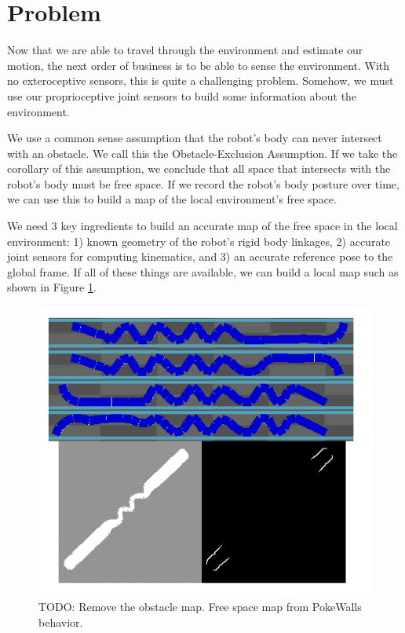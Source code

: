 
\label{chap:sensing}

\section{Problem}

Now that we are able to travel through the environment and estimate our motion, the next order of business is to be able to sense the environment.  With no exteroceptive sensors, this is quite a challenging problem.  Somehow, we must use our proprioceptive joint sensors to build some information about the environment.

We use a common sense assumption that the robot's body can never intersect with an obstacle.  We call this the Obstacle-Exclusion Assumption.  If we take the corollary of this assumption, we conclude that all space that intersects with the robot's body must be free space.  If we record the robot's body posture over time, we can use this to build a map of the local environment's free space.

We need 3 key ingredients to build an accurate map of the free space in the local environment:  1) known geometry of the robot's rigid body linkages, 2) accurate joint sensors for computing kinematics, and 3) an accurate reference pose to the global frame.  If all of these things are available, we can build a local map such as shown in Figure \ref{pokeBehavior}.

\begin{figure}
  \begin{center}
    \includegraphics[scale=0.7]{PokeBehavior.png}
  \end{center}
  \caption{TODO: Remove the obstacle map.  Free space map from PokeWalls behavior.}
	\label{pokeBehavior}
\end{figure}

